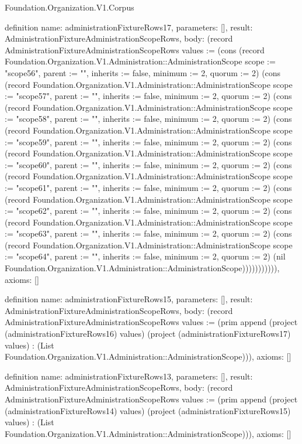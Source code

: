 \begin{lexlean}{Foundation.Organization.V1.Corpus}
\begin{semanticmodule}
definition{
  name: administrationFixtureRows17,
  parameters: [],
  result: AdministrationFixtureAdministrationScopeRows,
  body: (record AdministrationFixtureAdministrationScopeRows {values := (cons (record Foundation.Organization.V1.Administration::AdministrationScope {scope := "scope56", parent := "", inherits := false, minimum := 2, quorum := 2}) (cons (record Foundation.Organization.V1.Administration::AdministrationScope {scope := "scope57", parent := "", inherits := false, minimum := 2, quorum := 2}) (cons (record Foundation.Organization.V1.Administration::AdministrationScope {scope := "scope58", parent := "", inherits := false, minimum := 2, quorum := 2}) (cons (record Foundation.Organization.V1.Administration::AdministrationScope {scope := "scope59", parent := "", inherits := false, minimum := 2, quorum := 2}) (cons (record Foundation.Organization.V1.Administration::AdministrationScope {scope := "scope60", parent := "", inherits := false, minimum := 2, quorum := 2}) (cons (record Foundation.Organization.V1.Administration::AdministrationScope {scope := "scope61", parent := "", inherits := false, minimum := 2, quorum := 2}) (cons (record Foundation.Organization.V1.Administration::AdministrationScope {scope := "scope62", parent := "", inherits := false, minimum := 2, quorum := 2}) (cons (record Foundation.Organization.V1.Administration::AdministrationScope {scope := "scope63", parent := "", inherits := false, minimum := 2, quorum := 2}) (cons (record Foundation.Organization.V1.Administration::AdministrationScope {scope := "scope64", parent := "", inherits := false, minimum := 2, quorum := 2}) (nil Foundation.Organization.V1.Administration::AdministrationScope))))))))))}),
  axioms: []
}

definition{
  name: administrationFixtureRows15,
  parameters: [],
  result: AdministrationFixtureAdministrationScopeRows,
  body: (record AdministrationFixtureAdministrationScopeRows {values := (prim append (project (administrationFixtureRows16) values) (project (administrationFixtureRows17) values) : (List Foundation.Organization.V1.Administration::AdministrationScope))}),
  axioms: []
}

definition{
  name: administrationFixtureRows13,
  parameters: [],
  result: AdministrationFixtureAdministrationScopeRows,
  body: (record AdministrationFixtureAdministrationScopeRows {values := (prim append (project (administrationFixtureRows14) values) (project (administrationFixtureRows15) values) : (List Foundation.Organization.V1.Administration::AdministrationScope))}),
  axioms: []
}


\end{semanticmodule}
\end{lexlean}
